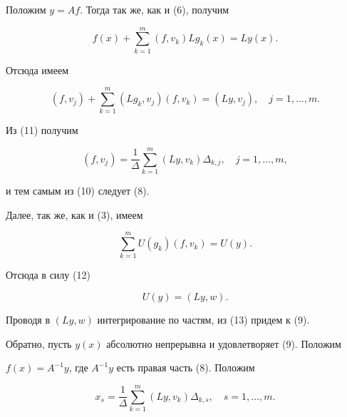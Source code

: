 \begin{pf}


Положим $y=Af$. Тогда так же, как и (6), получим


\begin{equation}


f(x)+\sum\limits_{k=1}^m (f,v_k)Lg_k(x)=Ly(x).


\end{equation}


Отсюда имеем


\begin{equation}


(f,v_j)+\sum\limits_{k=1}^m (Lg_k,v_j)(f,v_k)=(Ly,v_j),\quad


j=1,\dotsc,m.


\end{equation}


Из (11) получим


\begin{equation}


(f,v_j)=\frac1\Delta\sum\limits_{k=1}^m (Ly,v_k)\Delta_{k,j},\quad


j=1,\dotsc,m,


\end{equation}


и тем самым из (10) следует (8).





Далее, так же, как и (3), имеем


$$


\sum\limits_{k=1}^mU(g_k)(f,v_k)=U(y).


$$


Отсюда в силу (12)


\begin{equation}


U(y)=(Ly,w).


\end{equation}


Проводя в $(Ly,w)$ интегрирование по частям, из (13) придем к (9).


Обратно, пусть $y(x)$ абсолютно непрерывна и удовлетворяет (9). Положим


$f(x)=A^{-1}y$, где $A^{-1}y$ есть правая часть (8). Положим


\begin{equation}


x_s=\frac1\Delta\sum\limits_{k=1}^m (Ly,v_k)\Delta_{k,s},\quad


s=1,\dotsc,m.


\end{equation}



\end{pf}
